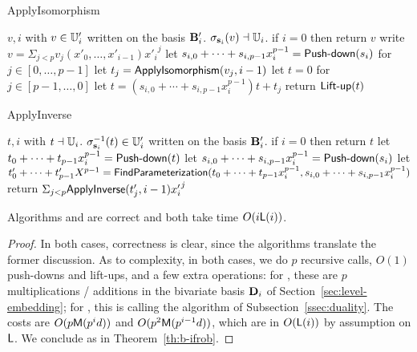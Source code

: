 \begin{algorithm}
  \caption{ApplyIsomorphism} 
  \begin{algorithmic}[1]
    \REQUIRE $v,i$ with $v\in \mathbb{U}'_i$ written on the basis $\mathbf{B}'_i$.
    \ENSURE $\sigma_{\mathbf{s}_i}(v) \dashv \mathbb{U}_i$.
    \STATE if $i=0$ then return $v$
    \STATE write $v=\Sigma_{j <p} v_j(x'_0,\dots,x'_{i-1}) {x'_i}^j$
    \STATE let $s_{i,0}+\cdots+s_{i,p-1}x_i^{p-1}=\text{{\sf Push-down}}(s_i)$
    \STATE for $j \in [0,\dots,p-1]$ let $t_j={\sf ApplyIsomorphism}(v_j,i-1)$
    \STATE let $t=0$
    \STATE  for $j \in [p-1,\dots,0]$ let $t=(s_{i,0}+\cdots+s_{i,p-1}x_i^{p-1})t+t_j$
    \STATE return $\text{{\sf Lift-up}}(t)$
  \end{algorithmic}
\end{algorithm}
\begin{algorithm}
  \caption{ApplyInverse} 
  \begin{algorithmic}[1]
    \REQUIRE $t,i$ with $t \dashv \mathbb{U}_i$.
    \ENSURE $\sigma_{\mathbf{s}_i}^{-1}(t)\in \mathbb{U}'_i$ written on the basis $\mathbf{B}'_i$.
    \STATE if $i=0$ then return $t$
    \STATE let $t_0 + \cdots + t_{p-1}x_i^{p-1} = \text{{\sf Push-down}}(t)$
    \STATE let $s_{i,0}+\cdots+s_{i,p-1}x_i^{p-1}=\text{{\sf Push-down}}(s_i)$
    \STATE let $t'_0 + \cdots + t'_{p-1}X^{p-1} = {\sf FindParameterization}
  (t_0 + \cdots + t_{p-1}x_i^{p-1}, s_{i,0}+\cdots+s_{i,p-1}x_i^{p-1})$
  \STATE return $\Sigma_{j < p} {\sf ApplyInverse}(t'_j, i-1) {x'_i}^j$
\end{algorithmic}
\end{algorithm}


\begin{proposition}\label{Prop:apply}
  Algorithms  and   are
correct and both take time $O(i\mathsf{L}(i))$.
\end{proposition}
\begin{proof} In both cases, correctness is clear, since the algorithms
translate the former discussion. As to complexity, in both cases, we
do $p$ recursive calls, $O(1)$ push-downs and lift-ups, and a few
extra operations: for , these are $p$
multiplications / additions in the bivariate basis ${\bf D}_i$ of
Section~\ref{sec:level-embedding}; for , this is
calling the algorithm  of
Subsection~\ref{ssec:duality}.  The costs are $O(p\mathrm{\sf M}(p^id))$ and
$O(p^2\mathrm{\sf M}(p^{i-1}d))$, which are in $O(\mathsf{L}(i))$ by assumption on
$\mathsf{L}$. We conclude as in Theorem~\ref{th:b-ifrob}.\end{proof}

